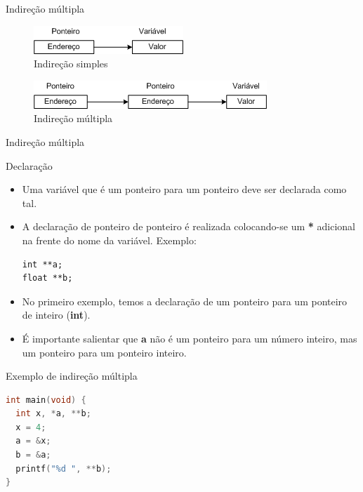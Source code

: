 \begin{frame}[c]{Indireção múltipla}
  \begin{figure}[ht]
    \centering
    \includegraphics[width=.6\textwidth]{figs/fig_ponteiros/indirecao-simples} 
    \caption{Indireção simples}
  \end{figure}
            
  \begin{figure}[ht]
    \centering
    \includegraphics[width=.6\textwidth]{figs/fig_ponteiros/indirecao-multipla}
    \caption{Indireção múltipla}
  \end{figure}
\end{frame}

\begin{frame}[fragile,c]{Indireção múltipla}
\begin{block}{Declaração}
  \begin{itemize}[<+->]
    \item Uma variável que é um ponteiro para um ponteiro deve ser declarada como tal.
    \item A declaração de ponteiro de ponteiro é realizada colocando-se um \textbf{*} adicional na frente do nome da variável. Exemplo:   
\begin{lstlisting}
int **a;
float **b;
\end{lstlisting}
  \item No primeiro exemplo, temos a declaração de um ponteiro para um ponteiro de inteiro (\textbf{int}). 
  \item \alert{É importante salientar que \textbf{a} não é um ponteiro para um número inteiro, mas um ponteiro para um ponteiro inteiro.}
  \end{itemize}
\end{block}    
\end{frame}

\begin{frame}[fragile,c]{Exemplo de indireção múltipla}
\begin{lstlisting}[language=C]
int main(void) {
  int x, *a, **b;
  x = 4;
  a = &x;
  b = &a;
  printf("%d ", **b);
}
\end{lstlisting}
\end{frame}


